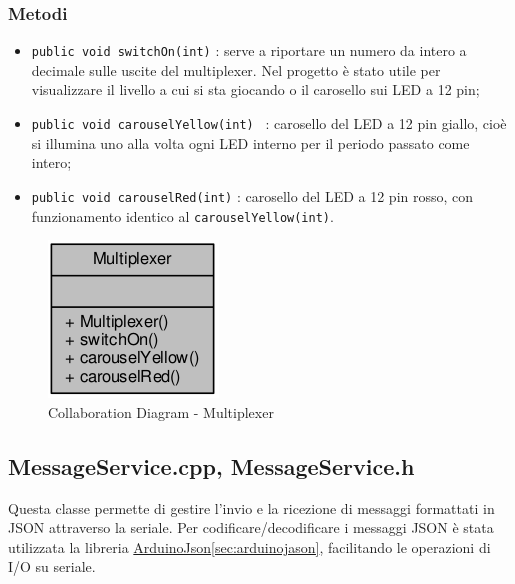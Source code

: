 \subsubsection{Metodi}
\begin{itemize}
	\item \texttt{public void switchOn(int)} : serve a riportare un numero da intero a decimale sulle uscite del multiplexer. Nel progetto è stato utile per visualizzare il livello a cui si sta giocando o il carosello sui LED a 12 pin;
	\item \texttt{public void carouselYellow(int) } : carosello del LED a 12 pin giallo, cioè si illumina uno alla volta ogni LED interno per il periodo passato come intero;
	\item \texttt{public void carouselRed(int)} : carosello del LED a 12 pin rosso, con funzionamento identico al \texttt{carouselYellow(int)}.
\end{itemize}
\begin{figure}[!ht]
	\centering
	\includegraphics[scale=.5]{img/UML/CollaborationDiagram/Multiplexer.png}
	\caption{Collaboration Diagram - Multiplexer}
\end{figure}

\newpage
\subsection{MessageService.cpp, MessageService.h}
Questa classe permette di gestire l'invio e la ricezione di messaggi formattati in JSON attraverso la seriale.
Per codificare/decodificare i messaggi JSON è stata utilizzata la libreria \href{https://github.com/bblanchon/ArduinoJson}{ArduinoJson}\ref{sec:arduinojason}, facilitando le operazioni di I/O su seriale.
